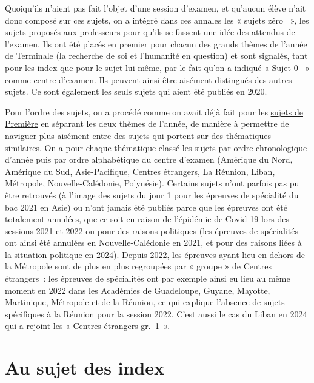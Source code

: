 Quoiqu'ils n'aient pas fait l'objet d'une session d'examen, et qu'aucun élève n'ait donc composé sur ces sujets, on a intégré dans ces annales les « sujets zéro ~»{}, \cad{} les sujets proposés aux professeurs pour qu'ils se fassent une idée des attendus de l'examen. Ils ont été placés en premier pour chacun des grands thèmes de l'année de Terminale (la recherche de soi et l'humanité en question) et sont signalés, tant pour les index que pour le sujet lui-même, par le fait qu'on a indiqué « Sujet 0 ~»{} comme centre d'examen. Ils peuvent ainsi être aisément distingués des autres sujets. Ce sont également les seuls sujets qui aient été publiés en 2020.

Pour l'ordre des sujets, on a procédé comme on avait déjà fait pour les \href{https://drive.google.com/file/d/1KN7gwAOkmIXFNAGYKYemD3y7Q0n68Phn/view?usp=sharing}{sujets de Première} en séparant les deux thèmes de l'année, de manière à permettre de naviguer plus aisément entre des sujets qui portent sur des thématiques similaires. On a pour chaque thématique classé les sujets par ordre chronologique d'année puis par ordre alphabétique du centre d'examen (Amérique du Nord, Amérique du Sud, Asie-Pacifique, Centres étrangers, La Réunion, Liban, Métropole, Nouvelle-Calédonie, Polynésie). Certains sujets n'ont parfois pas pu être retrouvés (à l'image des sujets du jour 1 pour les épreuves de spécialité du bac 2021 en Asie) ou n'ont jamais été publiés parce que les épreuves ont été totalement annulées, que ce soit en raison de l'épidémie de Covid-19 lors des sessions 2021 et 2022 ou pour des raisons politiques (les épreuves de spécialités ont ainsi été annulées en Nouvelle-Calédonie en 2021, et pour des raisons liées à la situation politique en 2024). Depuis 2022, les épreuves ayant lieu en-dehors de la Métropole sont de plus en plus regroupées par « groupe » de Centres étrangers~: les épreuves de spécialités ont par exemple ainsi eu lieu au même moment en 2022 dans les Académies de Guadeloupe, Guyane, Mayotte, Martinique, Métropole et de la Réunion, ce qui explique l'absence de sujets spécifiques à la Réunion pour la session 2022. C'est aussi le cas du Liban en 2024 qui a rejoint les « Centres étrangers gr.~1~»{}.

\section*{Au sujet des index}

